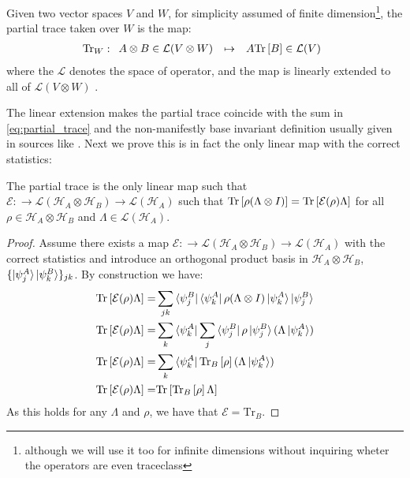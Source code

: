 \begin{definition}
  Given two vector spaces $V$ and $W$, for simplicity assumed of finite dimension\footnote{although we will use it too for infinite dimensions without inquiring wheter the operators are even traceclass}, the partial trace taken over $W$ is the map\cite{nielsen_quantum_2010}:
\[
\mathrm{Tr}_{W}: \begin{array}{rcl}
A\otimes B \in \mathcal{L}(V\otimes W)& \mapsto & A \mathrm{Tr}\left[B\right] \in \mathcal{L}(V)
\end{array}
\]
where the $\mathcal{L}$ denotes the space of operator, and the map is  linearly extended to all of $\mathcal{L}(V\otimes W)$
.
\end{definition}
The linear extension makes the partial trace coincide with the sum in \eqref{eq:partial_trace} and the non-manifestly base invariant definition
usually given in sources like \cite{maziero2017computing}. Next we prove this is in fact the only linear map with the correct statistics:
\begin{theorem}
  The partial trace is the only linear map such that $\mathcal{E}:\to \mathcal{L}(\mathcal{H}_{A}\otimes \mathcal{H}_{B}) \to \mathcal{L}(\mathcal{H}_{A})$
  such that $\mathrm{Tr}\left[\rho (\Lambda\otimes I)\right] = \mathrm{Tr}\left[\mathcal{E}(\rho)\Lambda\right]$ for all $\rho \in \mathcal{H}_{A}\otimes \mathcal{H}_{B}$ and
  $\Lambda \in \mathcal{L}(\mathcal{H}_{A})$.
\end{theorem}
\begin{proof}
  Assume there exists a map $\mathcal{E}:\to \mathcal{L}(\mathcal{H}_{A}\otimes \mathcal{H}_{B}) \to \mathcal{L}(\mathcal{H}_{A})$ with the
  correct statistics and introduce an orthogonal product basis in $\mathcal{H}_{A}\otimes \mathcal{H}_{B}$,
  $\{\ket{\psi^{A}_{j}}\ket{\psi^{B}_{k}}\}_{jk}$. By construction we have:
  \begin{align}
    \mathrm{Tr}\left[\mathcal{E}(\rho)\Lambda\right] =& \sum_{jk} \bra{\psi^{B}_{j}}\bra{\psi^{A}_{k}}\rho (\Lambda \otimes I) \ket{\psi^{A}_{k}}\ket{\psi^{B}_{j}}\\
 \mathrm{Tr}\left[\mathcal{E}(\rho)\Lambda\right] =& \sum_{k} \bra{\psi_{k}^{A}}\sum_{j}\bra{\psi^{B}_{j}}\rho\ket{\psi^{B}_{j}}(\Lambda \ket{\psi_{k}^{A}})\\
\mathrm{Tr}\left[\mathcal{E}(\rho)\Lambda\right] =& \sum_{k} \bra{\psi_{k}^{A}}\mathrm{Tr}_{B}\left[\rho\right](\Lambda\ket{\psi_{k}^{A}})\\
\mathrm{Tr}\left[\mathcal{E}(\rho)\Lambda\right] =& \mathrm{Tr}\left[\mathrm{Tr}_{B}\left[\rho\right]\Lambda\right]\\
  \end{align}
  As this holds for any $\Lambda$ and $\rho$, we have that $\mathcal{E}=\mathrm{Tr}_{B}$.
\end{proof}
